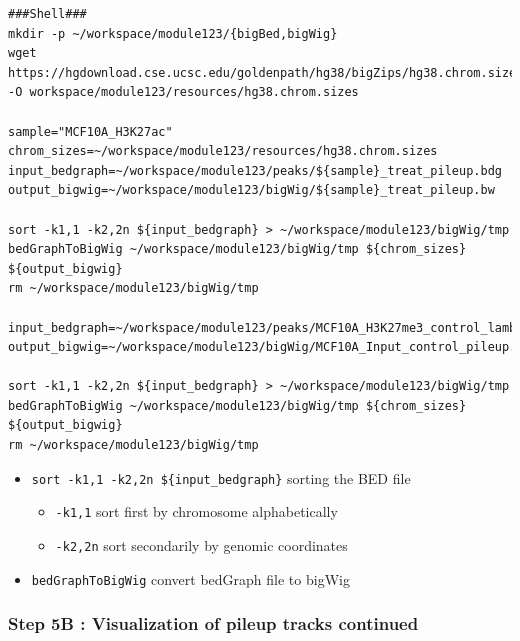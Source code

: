 \documentclass[
]{book}
\providecommand{\tightlist}{%
  \setlength{\itemsep}{0pt}\setlength{\parskip}{0pt}}
\begin{document}
\begin{verbatim}
###Shell###
mkdir -p ~/workspace/module123/{bigBed,bigWig}
wget https://hgdownload.cse.ucsc.edu/goldenpath/hg38/bigZips/hg38.chrom.sizes -O workspace/module123/resources/hg38.chrom.sizes

sample="MCF10A_H3K27ac"
chrom_sizes=~/workspace/module123/resources/hg38.chrom.sizes
input_bedgraph=~/workspace/module123/peaks/${sample}_treat_pileup.bdg
output_bigwig=~/workspace/module123/bigWig/${sample}_treat_pileup.bw

sort -k1,1 -k2,2n ${input_bedgraph} > ~/workspace/module123/bigWig/tmp
bedGraphToBigWig ~/workspace/module123/bigWig/tmp ${chrom_sizes} ${output_bigwig}
rm ~/workspace/module123/bigWig/tmp

input_bedgraph=~/workspace/module123/peaks/MCF10A_H3K27me3_control_lambda.bdg
output_bigwig=~/workspace/module123/bigWig/MCF10A_Input_control_pileup.bw

sort -k1,1 -k2,2n ${input_bedgraph} > ~/workspace/module123/bigWig/tmp
bedGraphToBigWig ~/workspace/module123/bigWig/tmp ${chrom_sizes} ${output_bigwig}
rm ~/workspace/module123/bigWig/tmp
\end{verbatim}

\begin{itemize}
\tightlist
\item
  \texttt{sort\ -k1,1\ -k2,2n\ \$\{input\_bedgraph\}} sorting the BED file

  \begin{itemize}
  \tightlist
  \item
    \texttt{-k1,1} sort first by chromosome alphabetically
  \item
    \texttt{-k2,2n} sort secondarily by genomic coordinates
  \end{itemize}
\item
  \texttt{bedGraphToBigWig} convert bedGraph file to bigWig
\end{itemize}

\subsubsection{Step 5B : Visualization of pileup tracks continued}\label{step-5b-visualization-of-pileup-tracks-continued}
\end{document}
